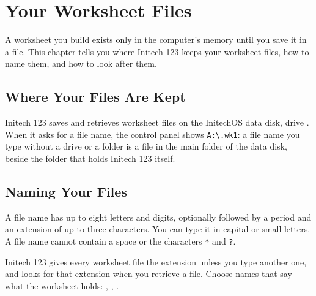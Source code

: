 \chapter{Your Worksheet Files}

A worksheet you build exists only in the computer's memory until you save
it in a file.  This chapter tells you where Initech 123 keeps your
worksheet files, how to name them, and how to look after them.

\section{Where Your Files Are Kept}
Initech 123 saves and retrieves worksheet files on the InitechOS data disk,
drive .  When it asks for a file name, the control panel shows
\texttt{A:\textbackslash *.wk1}: a file name you type without a drive or a
folder is a file in the main folder of the data disk, beside the folder
 that holds Initech 123 itself.

\section{Naming Your Files}
A file name has up to eight letters and digits, optionally followed by a period
and an extension of up to three characters.  You can type it in capital or
small letters.  A file name cannot contain a space or the characters
\texttt{*} and \texttt{?}.

Initech 123 gives every worksheet file the extension  unless you
type another one, and looks for that extension when you retrieve a file.
Choose names that say what the worksheet holds:
, , .

